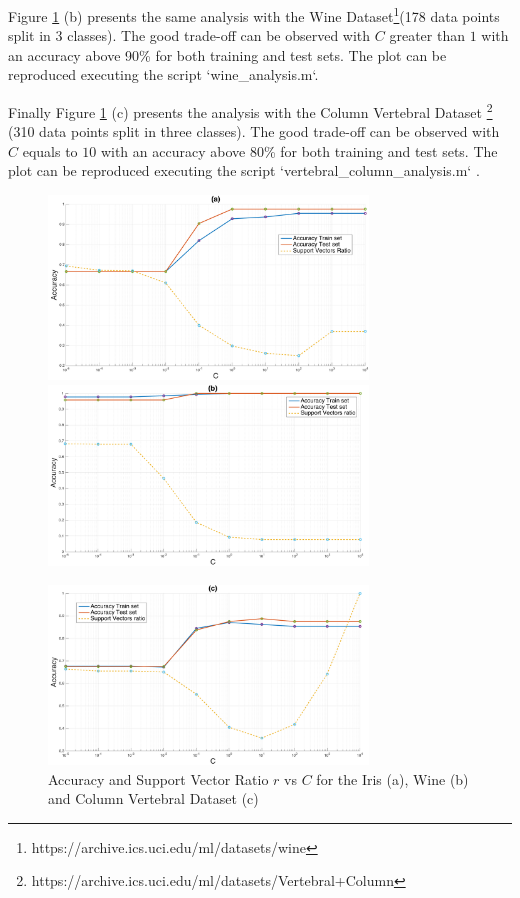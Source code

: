 Figure \ref{fig:datasets} (b) presents the same analysis with the Wine Dataset\footnote{https://archive.ics.uci.edu/ml/datasets/wine}(178 data points split in 3 classes).
The good trade-off can be observed with $C$ greater than $1$ with an accuracy above 90\% for both training and test sets.
The plot can be reproduced executing the script `wine\_analysis.m`.

Finally Figure \ref{fig:datasets} (c) presents the analysis with the Column Vertebral Dataset \footnote{https://archive.ics.uci.edu/ml/datasets/Vertebral+Column} (310 data points split in three classes).
The good trade-off can be observed with $C$ equals to $10$ with an accuracy above 80\% for both training and test sets.
The plot can be reproduced executing the script `vertebral\_column\_analysis.m` .

\begin{figure}[!htb]
\begin{center}
\includegraphics [width=8.5cm] {./graphics/iris.png}
\includegraphics [width=8.5cm] {./graphics/wine.png}

\includegraphics [width=8.5cm] {./graphics/vertebral_column.png}
\caption{Accuracy and Support Vector Ratio $r$ vs $C$ for the Iris (a), Wine (b) and Column Vertebral Dataset (c)} \label{fig:datasets}
\end{center}
\end{figure}